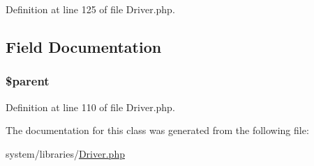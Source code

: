 Definition at line 125 of file Driver.\-php.



\subsection{Field Documentation}
\hypertarget{class_c_i___driver_a4e2313a4b35b72a06ac45fd38960f677}{
\subsubsection[{\$parent}]{\setlength{\rightskip}{0pt plus 5cm}\${\bf parent}\hspace{0.3cm}{\ttfamily [protected]}}}\label{class_c_i___driver_a4e2313a4b35b72a06ac45fd38960f677}


Definition at line 110 of file Driver.\-php.



The documentation for this class was generated from the following file\-:\begin{DoxyCompactItemize}
\item 
system/libraries/\hyperlink{_driver_8php}{Driver.\-php}\end{DoxyCompactItemize}
